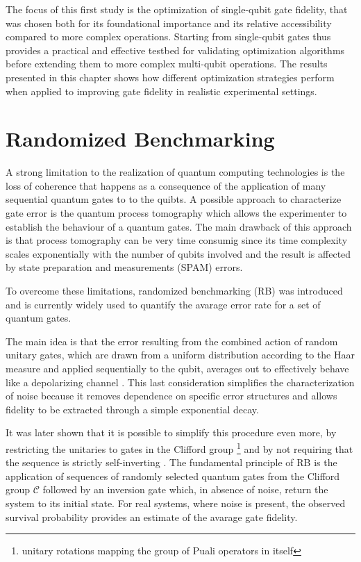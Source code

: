 The focus of this first study is the optimization of single-qubit gate fidelity, that was chosen both for its foundational importance and its relative accessibility compared to more complex operations.
Starting from single-qubit gates thus provides a practical and effective testbed for validating optimization algorithms before extending them to more complex multi-qubit operations.
The results presented in this chapter shows how different optimization strategies perform when applied to improving gate fidelity in realistic experimental settings.

\section{Randomized Benchmarking}\label{sec:RBsection}
A strong limitation to the realization of quantum computing technologies is the loss of coherence that happens as a consequence of the application of many sequential quantum gates to to the quibts.
A possible approach to characterize gate error is the quantum process tomography which allows the experimenter to establish the behaviour of a quantum gates. 
The main drawback of this approach is that process tomography can be very time consumig since its time complexity scales exponentially with the number of qubits involved \cite{QPTomography} and the result is affected by state preparation and measurements (SPAM) errors.

To overcome these limitations, randomized benchmarking (RB) was introduced and is currently widely used to quantify the avarage error rate for a set of quantum gates.

The main idea is that the error resulting from the combined action of random unitary gates, which are drawn from a uniform distribution according to the Haar measure \cite{Mele_2024} and applied sequentially to the qubit, averages out to effectively behave like a depolarizing channel \cite{Emerson_2005_RB}.
This last consideration simplifies the characterization of noise because it removes dependence on specific error structures and allows fidelity to be extracted through a simple exponential decay.

It was later shown that it is possible to simplify this procedure even more, by restricting the unitaries to gates in the Clifford group \footnote{unitary rotations mapping the group of Puali operators in itself} and by not requiring that the sequence is strictly self-inverting \cite{knill_randomized_2008}.
The fundamental principle of RB is the application of sequences of randomly selected quantum gates from the Clifford group $\mathcal{C}$ followed by an inversion gate which, in absence of noise, return the system to its initial state. 
For real systems, where noise is present, the observed survival probability provides an estimate of the avarage gate fidelity.

